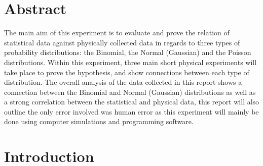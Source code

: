 \documentclass[11pt]{article}
\begin{document}

\newpage
\begin{titlepage}
\begin{tableofcontents}

\end{tableofcontents}
\end{titlepage}


\section{Abstract}
\label{Abstract Section}

The main aim of this experiment is to evaluate and prove the relation of statistical data against physically collected data in regards to three types of probability distributions: the Binomial, the Normal (Gaussian) and the Poisson distributions. Within this experiment, three main short physical experiments will take place to prove the hypothesis, and show connections between each type of distribution. The overall analysis of the data collected in this report shows a connection between the Binomial and Normal (Gaussian) distributions as well as a strong correlation between the statistical and physical data, this report will also outline the only error involved was human error as this experiment will mainly be done using computer simulations and programming software.


\section{Introduction}
\label{Introduction Section}
\end{document}
